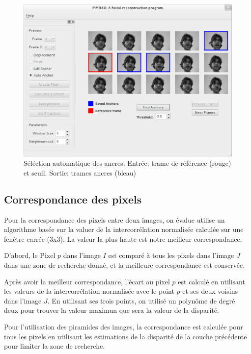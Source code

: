 \documentclass[a4paper,11pt]{article}
\begin{document}
\begin{figure}[h!]
  \begin{center}
    \includegraphics[scale=0.4]{img/AnchorAutomaticSelection.png}
    \caption{Séléction automatique des ancres. Entrée: trame de référence (rouge) et seuil. Sortie: trames ancres (bleau)}
  \end{center}
\end{figure}


\subsection{Correspondance des pixels}

Pour la correspondance des pixels entre deux images, on évalue utilise un algorithme basée sur la valuer de la intercorrélation normalisée calculée sur une fenêtre carrée (3x3). La valeur la plus haute est notre meilleur correspondance.

D'abord, le Pixel $p$ dans l'image $I$ est comparé à tous les pixels dans l'image $J$ dans une zone de recherche donné, et la meilleure correspondance est conservée. 

Après avoir la meilleur correspondance, l'écart au pixel $p$ est calculé en utilisant les valeurs de la intercorrélation normalisée avec le point $p$ et ses deux voisins dans l'image $J$. En utilisant ses trois points, on utilisé un polynôme de degré deux pour trouver la valeur maximun que sera la valeur de la disparité.

Pour l'utilisation des piramides des images, la correspondance est calculée pour tous les pixels en utilisant les estimations de la disparité de la couche précédente pour limiter la zone de recherche. 
\end{document}

